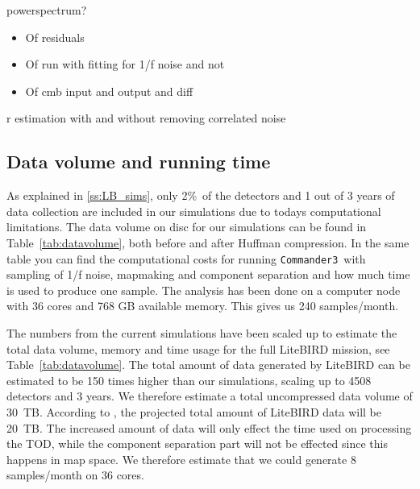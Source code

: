 \documentclass[twocolumn]{aa}
\def\commanderthree{\texttt{Commander3}}
\begin{document}
powerspectrum?
\begin{itemize}
	\item{Of residuals}
	\item{Of run with fitting for 1/f noise and not}
	\item{Of cmb input and output and diff}
\end{itemize}
r estimation with and without removing correlated noise


\subsection{Data volume and running time}
As explained in \ref{ss:LB_sims}, only 2\%\ of the detectors and 1 out of 3 years of data collection are included in our simulations due to todays computational limitations. The data volume on disc for our simulations can be found in Table~\ref{tab:datavolume}, both before and after Huffman compression. In the same table  you can find the computational costs for running \commanderthree\ with sampling of 1/f noise, mapmaking and component separation and how much time is used to produce one sample. The analysis has been done on a computer node with 36 cores and 768 GB available memory. This gives us 240 samples/month. 

The numbers from the current simulations have been scaled up to estimate the total data volume, memory and time usage for the full LiteBIRD mission, see Table~\ref{tab:datavolume}. The total amount of data generated by LiteBIRD can be estimated to be 150 times higher than our simulations, scaling up to 4508 detectors and 3 years. We therefore estimate a total uncompressed data volume of 30~TB. According to \cite{LiteBIRD-Note-023}, the projected total amount of LiteBIRD data will be 20~TB. The increased amount of data will only effect the time used on processing the TOD, while the component separation part will not be effected since this happens in map space. We therefore estimate that we could generate 8 samples/month on 36 cores. 
\end{document}

